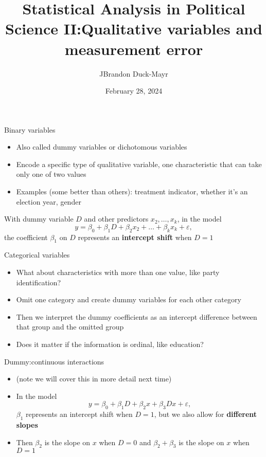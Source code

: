 \documentclass[
  ignorenonframetext,
]{beamer}
\title{Statistical Analysis in Political Science II:\newline Qualitative variables and measurement error}
\author{JBrandon Duck-Mayr}
\date{February 28, 2024}
\providecommand{\tightlist}{%
  \setlength{\itemsep}{0pt}\setlength{\parskip}{0pt}}
\newcommand{\setsep}{\setlength{\itemsep}{3pt}}
\newcommand{\setskip}{\setlength{\parskip}{3pt}}
\renewcommand{\tightlist}{\setsep\setskip}
\begin{document}
\frame{\titlepage}

\begin{frame}{Binary variables}
\protect\hypertarget{binary-variables}{}
\pause

\begin{itemize}[<+->]
\tightlist
\item
  Also called dummy variables or dichotomous variables
\item
  Encode a specific type of qualitative variable, one characteristic that can take only one of two values
\item
  Examples (some better than others): treatment indicator, whether it's an election year, gender
\end{itemize}

\pause

With dummy variable \(D\) and other predictors \(x_2, \dots, x_k\),
in the model
\[
y = \beta_0 + \beta_1 D + \beta_2 x_2 + \dots + \beta_k x_k + \varepsilon,
\]
the coefficient \(\beta_1\) on \(D\) represents an \textbf{intercept shift} when \(D = 1\)
\end{frame}

\begin{frame}{Categorical variables}
\protect\hypertarget{categorical-variables}{}
\pause

\begin{itemize}[<+->]
\tightlist
\item
  What about characteristics with more than one value, like party identification?
\item
  Omit one category and create dummy variables for each other category
\item
  Then we interpret the dummy coefficients as an intercept difference between that group and the omitted group
\item
  Does it matter if the information is ordinal, like education?
\end{itemize}
\end{frame}

\begin{frame}{Dummy:continuous interactions}
\protect\hypertarget{dummycontinuous-interactions}{}
\pause

\begin{itemize}[<+->]
\tightlist
\item
  (note we will cover this in more detail next time)
\item
  In the model \[ y = \beta_0 + \beta_1 D + \beta_2 x + \beta_3 D x + \varepsilon, \] \(\beta_1\) represents an intercept shift when \(D = 1\), but we also allow for \textbf{different slopes}
\item
  Then \(\beta_2\) is the slope on \(x\) when \(D = 0\) and \(\beta_2 + \beta_3\) is the slope on \(x\) when \(D = 1\)
\end{itemize}
\end{frame}
\end{document}
